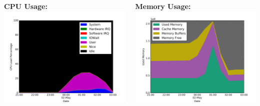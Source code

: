 \documentclass[aspectratio=169,11pt,hyperref={colorlinks=true}]{beamer}
\begin{document}
\begin{frame}
    \begin{columns}[T]
        \begin{column}{.48\textwidth}
            \textbf{CPU Usage:}\\
            \includegraphics[width=1.2\textwidth]{manual_load_cpu_usage.png}
        \end{column}
        \begin{column}{.48\textwidth}
            \textbf{Memory Usage:}\\
            \includegraphics[width=1.2\textwidth]{manual_load_ram_usage.png}
        \end{column}
    \end{columns}
\end{frame}
\end{document}

